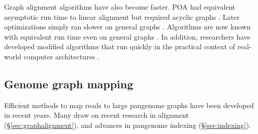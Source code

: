 Graph alignment algorithms have also become faster.
\textsc{POA} had equivalent asymptotic run time to linear alignment but required acyclic graphs \cite{Lee_2002}. 
Later optimizations simply ran slower on general graphs \cite{Kavya_2019}.
Algorithms are now known with equivalent run time even on general graphs \cite{Jain_2019a}.
In addition, researchers have developed modified algorithms that run quickly in the practical context of real-world computer architectures \cite{Suzuki_2018, Rautiainen_2019, Jain_2019b}.


\subsection{Genome graph mapping}
\label{sec:graphmapping}

Efficient methods to map reads to large pangenome graphs have been developed in recent years. %
Many draw on recent research in alignment (\S \ref{sec:graphalignment}), and advances in pangenome indexing (\S \ref{sec:indexing}).





